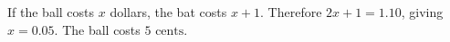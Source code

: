 If the ball costs $x$ dollars, the bat costs $x+1$. Therefore $2x+1=1.10$, giving $x=0.05$. The ball costs $\boxed{5\text{ cents}}$.
